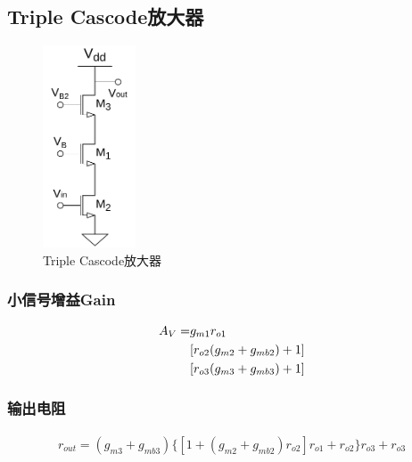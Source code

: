 \documentclass[twoside,a4paper,openright,titlepage,draft]{ctexrep}
\begin{document}
\subsection{Triple Cascode放大器}
\begin{multicols}{2}
    \begin{figure}[H]
        \centering
        \includegraphics[height=60mm]{triplecascode.drawio.pdf}
        \caption{Triple Cascode放大器}
        \label{fig:Triple Cascode放大器}
    \end{figure}
    \columnbreak
    \subsubsection{小信号增益Gain}
    \begin{align}
        A_V = &g_{m1}r_{o1} \notag \\
        &[r_{o2}(g_{m2}+g_{mb2})+1] \notag \\
        &[r_{o3}(g_{m3}+g_{mb3})+1]
    \end{align}    
\end{multicols}
\subsubsection{输出电阻}
\begin{align}
    r_{out} = (g_{m3} + g_{mb3})\{[1+(g_{m2}+g_{mb2})r_{o2}]r_{o1}+r_{o2}\}r_{o3}+r_{o3}
\end{align}
\end{document}
